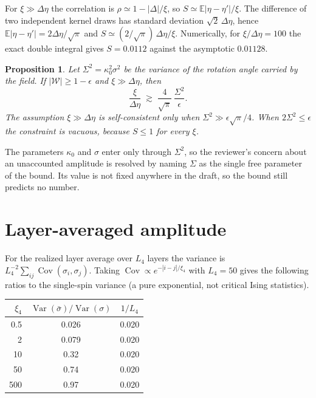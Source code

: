 \documentclass[11pt]{article}
\newtheorem{proposition}{Proposition}
\theoremstyle{remark}
\newcommand{\Wrec}{\Delta\eta}
\newcommand{\E}{\mathbb{E}}
\begin{document}
For $\xi\gg\Wrec$ the correlation is $\rho\simeq1-|\Delta|/\xi$, so $S\simeq\E|\eta-\eta'|/\xi$. The difference of two independent kernel draws has standard deviation $\sqrt2\,\Wrec$, hence $\E|\eta-\eta'|=2\Wrec/\sqrt\pi$ and $S\simeq(2/\sqrt\pi)\,\Wrec/\xi$. Numerically, for $\xi/\Wrec=100$ the exact double integral gives $S=0.0112$ against the asymptotic $0.01128$.

\begin{proposition}
Let $\Sigma^2=\kappa_0^2\sigma^2$ be the variance of the rotation angle carried by the field. If $|\mathcal W|\ge1-\epsilon$ and $\xi\gg\Wrec$, then
\[
\frac{\xi}{\Wrec}\;\gtrsim\;\frac{4}{\sqrt\pi}\,\frac{\Sigma^2}{\epsilon}.
\]
The assumption $\xi\gg\Wrec$ is self-consistent only when $\Sigma^2\gg\epsilon\sqrt\pi/4$. When $2\Sigma^2\le\epsilon$ the constraint is vacuous, because $S\le1$ for every $\xi$.
\end{proposition}

The parameters $\kappa_0$ and $\sigma$ enter only through $\Sigma^2$, so the reviewer's concern about an unaccounted amplitude is resolved by naming $\Sigma$ as the single free parameter of the bound. Its value is not fixed anywhere in the draft, so the bound still predicts no number.

\section{Layer-averaged amplitude}

For the realized layer average over $L_4$ layers the variance is $L_4^{-2}\sum_{ij}\operatorname{Cov}(\sigma_i,\sigma_j)$. Taking $\operatorname{Cov}\propto e^{-|i-j|/\xi_4}$ with $L_4=50$ gives the following ratios to the single-spin variance (a pure exponential, not critical Ising statistics).

\begin{table}[h]
\centering\small
\begin{tabular}{rcc}
\toprule
$\xi_4$ & $\operatorname{Var}(\bar\sigma)/\operatorname{Var}(\sigma)$ & $1/L_4$ \\
\midrule
0.5 & 0.026 & 0.020 \\
2 & 0.079 & 0.020 \\
10 & 0.32 & 0.020 \\
50 & 0.74 & 0.020 \\
500 & 0.97 & 0.020 \\
\bottomrule
\end{tabular}
\end{table}
\end{document}
